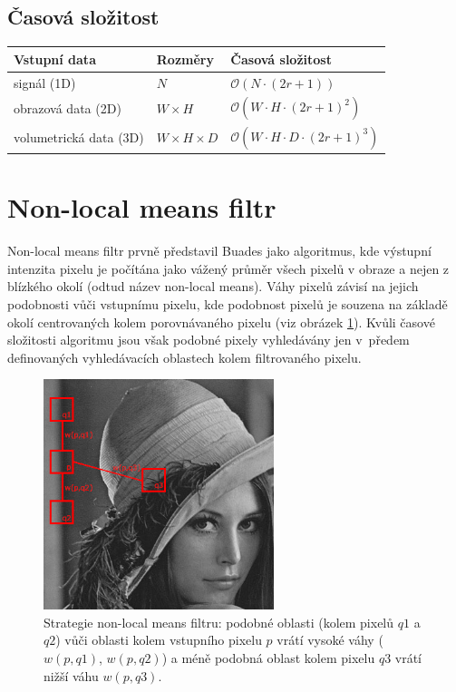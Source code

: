 \subsection*{Časová složitost}
\begin{tabularx}{1\textwidth}{ 
    >{\raggedright\arraybackslash}X 
    >{\raggedright\arraybackslash}X 
    >{\raggedright\arraybackslash}X }
    Vstupní data & Rozměry & Časová složitost \\
    \hline
    signál (1D) & $N$ & $\mathcal{O}(N \cdot (2r + 1))$ \\ 
    obrazová data (2D) & $W \times H$ & $\mathcal{O}(W \cdot H \cdot (2r + 1)^2)$ \\  
    volumetrická data (3D) & $W \times H \times D$ & $\mathcal{O}(W \cdot H \cdot D \cdot (2r + 1)^3)$
\end{tabularx}

\newpage

\section{Non-local means filtr}
\label{sec:theory:nlm}
Non-local means filtr prvně představil Buades \cite{nlm2005:buades} jako algoritmus, kde výstupní intenzita pixelu je počítána jako vážený průměr všech pixelů v obraze a nejen z blízkého okolí (odtud název non-local means). Váhy pixelů závisí na jejich podobnosti vůči vstupnímu pixelu, kde podobnost pixelů je souzena na základě okolí centrovaných kolem porovnávaného pixelu (viz obrázek \ref{fig:nlm:strategy}). Kvůli časové složitosti algoritmu jsou však podobné pixely vyhledávány jen v~předem definovaných vyhledávacích oblastech kolem filtrovaného pixelu.

\begin{figure} [H]
    \centering
    \label{fig:nlm:strategy}
    \includegraphics[width=0.6\textwidth]{figures/lena-nlm.png}
    \caption{Strategie non-local means filtru: podobné oblasti (kolem pixelů $q1$ a $q2$) vůči oblasti kolem vstupního pixelu $p$ vrátí vysoké váhy ($w(p,q1)$, $w(p,q2)$) a méně podobná oblast kolem pixelu $q3$ vrátí nižší váhu $w(p,q3)$. }
\end{figure}

